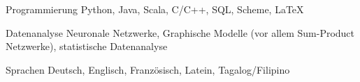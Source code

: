 

\begin{cvskills}

  \cvskill
    {Programmierung} %
    {Python, Java, Scala, C/C++, SQL, Scheme, LaTeX} %

  \cvskill
    {Datenanalyse} %
    {Neuronale Netzwerke, Graphische Modelle (vor allem Sum-Product Netzwerke), statistische Datenanalyse} %

  \cvskill
    {Sprachen} %
    {Deutsch, Englisch, Französisch, Latein, Tagalog/Filipino} %

\end{cvskills}
